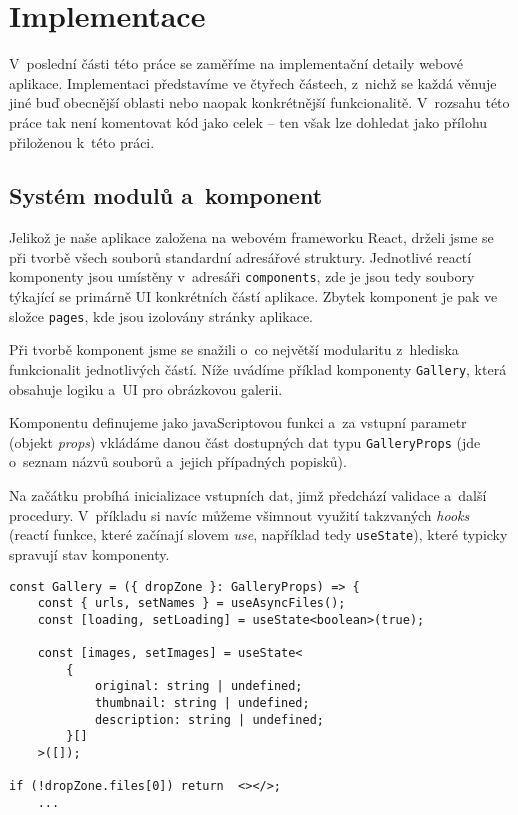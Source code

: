 \hypertarget{implementace}{%
\chapter{Implementace}\label{implementace}}

V~poslední části této práce se zaměříme na implementační detaily webové aplikace. Implementaci představíme ve čtyřech částech, z~nichž se každá věnuje jiné buď obecnější oblasti nebo naopak konkrétnější funkcionalitě. V~rozsahu této práce tak není komentovat kód jako celek -- ten však lze dohledat jako přílohu přiloženou k~této práci.

\hypertarget{systuxe9m-modulux16f-a-komponent}{%
\section{Systém modulů a~komponent}\label{systuxe9m-modulux16f-a-komponent}}

Jelikož je naše aplikace založena na webovém frameworku React, drželi jsme se při tvorbě všech souborů standardní adresářové struktury. Jednotlivé reactí komponenty jsou umístěny v~adresáři \verb|components|, zde je jsou tedy soubory týkající se primárně UI konkrétních částí aplikace. Zbytek komponent je pak ve složce \verb|pages|, kde jsou izolovány stránky aplikace.


Při tvorbě komponent jsme se snažili o~co největší modularitu z~hlediska funkcionalit jednotlivých částí. Níže uvádíme příklad komponenty \verb|Gallery|, která obsahuje logiku a~UI pro obrázkovou galerii.

Komponentu definujeme jako javaScriptovou funkci a~za vstupní parametr (objekt \emph{props}) vkládáme danou část dostupných dat typu \verb|GalleryProps| (jde o~seznam názvů souborů a~jejich případných popisků).

Na začátku probíhá inicializace vstupních dat, jimž předchází validace a~další procedury. V~příkladu si navíc můžeme všimnout využití takzvaných \emph{hooks} (reactí funkce, které začínají slovem \emph{use}, například tedy \verb|useState|), které typicky spravují stav komponenty.

\begin{verbatim}
const Gallery = ({ dropZone }: GalleryProps) => {
    const { urls, setNames } = useAsyncFiles();
    const [loading, setLoading] = useState<boolean>(true);
    
    const [images, setImages] = useState<
        {
            original: string | undefined;
            thumbnail: string | undefined;
            description: string | undefined;
        }[]
    >([]);
    
if (!dropZone.files[0]) return  <></>;
    ...
\end{verbatim}

